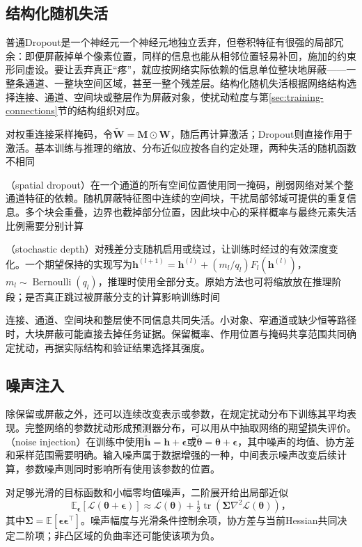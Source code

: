 \subsection{结构化随机失活}
\label{sec:generalization-structured-dropout}

普通Dropout是一个神经元一个神经元地独立丢弃，但卷积特征有很强的局部冗余：即便屏蔽掉单个像素位置，同样的信息也能从相邻位置轻易补回，施加的约束形同虚设。要让丢弃真正“疼”，就应按网络实际依赖的信息单位整块地屏蔽——一整条通道、一整块空间区域，甚至一整个残差层。结构化随机失活根据网络结构选择连接、通道、空间块或整层作为屏蔽对象，使扰动粒度与第\ref{sec:training-connections}节的结构组织对应。

对权重连接采样掩码，令$\tilde{\bm W}=\bm M\odot\bm W$，随后再计算激活；Dropout则直接作用于激活。基本训练与推理的缩放、分布近似应按各自约定处理，两种失活的随机函数不相同

（spatial dropout）在一个通道的所有空间位置使用同一掩码，削弱网络对某个整通道特征的依赖。随机屏蔽特征图中连续的空间块，干扰局部邻域可提供的重复信息。多个块会重叠，边界也截掉部分位置，因此块中心的采样概率与最终元素失活比例需要分别计算

（stochastic depth）对残差分支随机启用或绕过，让训练时经过的有效深度变化。一个期望保持的实现写为$\bm h^{(l+1)}=\bm h^{(l)}+(m_l/q_l)F_l(\bm h^{(l)})$，$m_l\sim\operatorname{Bernoulli}(q_l)$，推理时使用全部分支。原始方法也可将缩放放在推理阶段；是否真正跳过被屏蔽分支的计算影响训练时间

连接、通道、空间块和整层使不同信息共同失活。小对象、窄通道或缺少恒等路径时，大块屏蔽可能直接去掉任务证据。保留概率、作用位置与掩码共享范围共同确定扰动，再据实际结构和验证结果选择其强度。

\subsection{噪声注入}
\label{sec:generalization-noise}

除保留或屏蔽之外，还可以连续改变表示或参数，在规定扰动分布下训练其平均表现。完整网络的参数扰动形成预测器分布，可以用从中抽取网络的期望损失评价。（noise injection）在训练中使用$\tilde{\bm h}=\bm h+\bm\epsilon$或$\tilde{\bm\theta}=\bm\theta+\bm\epsilon$，其中噪声的均值、协方差和采样范围需要明确。输入噪声属于数据增强的一种，中间表示噪声改变后续计算，参数噪声则同时影响所有使用该参数的位置。

对足够光滑的目标函数和小幅零均值噪声，二阶展开给出局部近似
\begin{equation}
  \mathbb E_{\bm\epsilon}[\mathcal L(\bm\theta+\bm\epsilon)]
  \approx\mathcal L(\bm\theta)+\tfrac12
      \operatorname{tr}(\bm\Sigma\nabla^2\mathcal L(\bm\theta))\text{，}
  \label{eq:generalization-noise-expansion}
\end{equation}
其中$\bm\Sigma=\mathbb E[\bm\epsilon\bm\epsilon^{\top}]$。噪声幅度与光滑条件控制余项，协方差与当前Hessian共同决定二阶项；非凸区域的负曲率还可能使该项为负。

